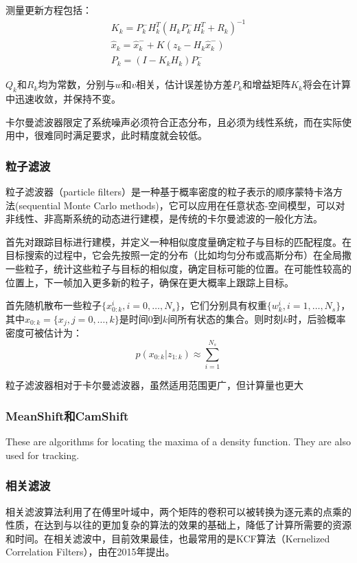   测量更新方程包括：
\begin{gather*}
K_k=P^{-}_k H^T_k(H_k P^{-}_k H^T_k + R_k)^{-1} \\
\hat{x}_k = \hat{x}^{-}_k + K (z_k - H_k \hat{x}^{-}_k) \\
P_k = (I-K_k H_k)P^{-}_k
\end{gather*}

  $Q_k$和$R_k$均为常数，分别与$w$和$v$相关，估计误差协方差$P_k$和增益矩阵$K_k$将会在计算中迅速收敛，并保持不变。

  卡尔曼滤波器限定了系统噪声必须符合正态分布，且必须为线性系统，而在实际使用中，很难同时满足要求，此时精度就会较低。

\subsubsection{粒子滤波}

  粒子滤波器（particle filters）是一种基于概率密度的粒子表示的顺序蒙特卡洛方法(sequential Monte Carlo methods)，它可以应用在任意状态-空间模型，可以对非线性、非高斯系统的动态进行建模，是传统的卡尔曼滤波的一般化方法\cite{arulampalam2002tutorial}。

  首先对跟踪目标进行建模，并定义一种相似度度量确定粒子与目标的匹配程度。在目标搜索的过程中，它会先按照一定的分布（比如均匀分布或高斯分布）在全局撒一些粒子，统计这些粒子与目标的相似度，确定目标可能的位置。在可能性较高的位置上，下一帧加入更多新的粒子，确保在更大概率上跟踪上目标。

  首先随机散布一些粒子$\{x^i_{0:k},i=0,\dots,N_s\}$，它们分别具有权重$\{w^i_k,i=1,\dots,N_s\}$，其中$x_{0:k}=\{x_j,j=0,\dots,k\}$是时间0到$k$间所有状态的集合。则时刻$k$时，后验概率密度可被估计为：
$$p(x_{0:k}|z_{1:k})\approx \sum^{N_s}_{i=1} $$

  粒子滤波器相对于卡尔曼滤波器，虽然适用范围更广，但计算量也更大

\subsubsection{MeanShift和CamShift}

These are algorithms for locating the maxima of a density function. They are also used for tracking.

\subsubsection{相关滤波}

  相关滤波算法利用了在傅里叶域中，两个矩阵的卷积可以被转换为逐元素的点乘的性质，在达到与以往的更加复杂的算法的效果的基础上，降低了计算所需要的资源和时间。在相关滤波中，目前效果最佳，也最常用的是KCF算法（Kernelized Correlation Filters），由\citet{henriques2015high}在2015年提出。


